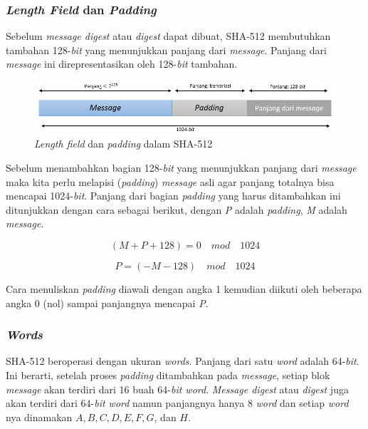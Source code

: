 \subsubsection{\textit{Length Field} dan \textit{Padding}}
Sebelum \textit{message digest} atau \textit{digest} dapat dibuat, SHA-512 membutuhkan tambahan 128-\textit{bit} yang menunjukkan panjang dari \textit{message}. Panjang dari \textit{message} ini direpresentasikan oleh 128-\textit{bit} tambahan.

\begin{figure}[H]
	\includegraphics[scale=0.6]{Gambar/length_field_padding}
	\centering
	\caption{\textit{Length field} dan \textit{padding} dalam SHA-512}
\end{figure}

Sebelum menambahkan bagian 128-\textit{bit} yang menunjukkan panjang dari \textit{message} maka kita perlu melapisi (\textit{padding}) \textit{message} asli agar panjang totalnya bisa mencapai 1024-\textit{bit}. Panjang dari bagian \textit{padding} yang harus ditambahkan ini ditunjukkan dengan cara sebagai berikut, dengan \textit{P} adalah \textit{padding}, \textit{M} adalah \textit{message}.

\begin{displaymath}
	(M + P + 128) = 0\quad mod\quad 1024
\end{displaymath}

\begin{displaymath}
	P = (-M - 128)\quad mod\quad 1024
\end{displaymath}

Cara menuliskan \textit{padding} diawali dengan angka 1 kemudian diikuti oleh beberapa angka 0 (nol) sampai panjangnya mencapai \textit{P}.

\subsubsection{\textit{Words}}
SHA-512 beroperasi dengan ukuran \textit{words}. Panjang dari satu \textit{word} adalah 64-\textit{bit}. Ini berarti, setelah proses \textit{padding} ditambahkan pada \textit{message}, setiap blok \textit{message} akan terdiri dari 16 buah 64-\textit{bit word}. \textit{Message digest} atau \textit{digest} juga akan terdiri dari 64-\textit{bit word} namun panjangnya hanya 8 \textit{word} dan setiap \textit{word} nya dinamakan \begin{math}A, B, C, D, E, F, G\end{math}, dan \begin{math}H\end{math}.

